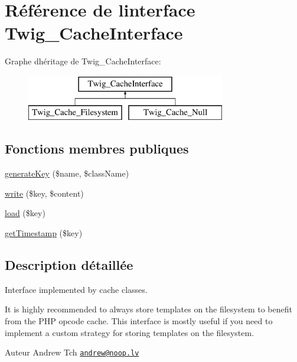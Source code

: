 \hypertarget{interface_twig___cache_interface}{}\section{Référence de l\textquotesingle{}interface Twig\+\_\+\+Cache\+Interface}
\label{interface_twig___cache_interface}
Graphe d\textquotesingle{}héritage de Twig\+\_\+\+Cache\+Interface\+:\begin{figure}[H]
\begin{center}
\leavevmode
\includegraphics[height=2.000000cm]{interface_twig___cache_interface}
\end{center}
\end{figure}
\subsection*{Fonctions membres publiques}
\begin{DoxyCompactItemize}
\item 
\hyperlink{interface_twig___cache_interface_aa552341b7edde6c210aef20fdd86986e}{generate\+Key} (\$name, \$class\+Name)
\item 
\hyperlink{interface_twig___cache_interface_abdff0953b972adfc563b2e2573d4920b}{write} (\$key, \$content)
\item 
\hyperlink{interface_twig___cache_interface_a8d0a51036af71436a1e8dcc26fc4281d}{load} (\$key)
\item 
\hyperlink{interface_twig___cache_interface_aff0cbcd61bb5f05632e20fd0baf65714}{get\+Timestamp} (\$key)
\end{DoxyCompactItemize}


\subsection{Description détaillée}
Interface implemented by cache classes.

It is highly recommended to always store templates on the filesystem to benefit from the P\+HP opcode cache. This interface is mostly useful if you need to implement a custom strategy for storing templates on the filesystem.

\begin{DoxyAuthor}{Auteur}
Andrew Tch \href{mailto:andrew@noop.lv}{\tt andrew@noop.\+lv} 
\end{DoxyAuthor}


